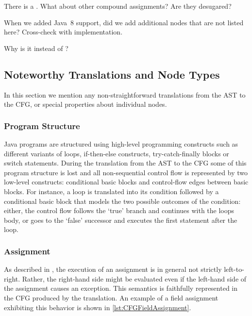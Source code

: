 \begin{workinprogress}
There is a .
What about other compound assignments? Are they desugared?
\end{workinprogress}

\begin{workinprogress}
When we added Java~8 support, did we add additional nodes that are not
listed here? Cross-check with implementation.
\end{workinprogress}

\begin{workinprogress}
Why is it  instead of ?
\end{workinprogress}


\subsection{Noteworthy Translations and Node Types}
\label{sec:noteworthy-translations}

In this section we mention any non-straightforward translations from the AST to
the CFG, or special properties about individual nodes.


\subsubsection{Program Structure}
\label{sec:prog-structure}

Java programs are structured using high-level programming constructs
such as different variants of loops, if-then-else constructs,
try-catch-finally blocks or switch statements.  During the translation
from the AST to the CFG some of this program structure is lost and all
non-sequential control flow is represented by two low-level
constructs: conditional basic blocks and control-flow edges between
basic blocks. For instance, a  loop is translated into its
condition followed by a conditional basic block that models the two
possible outcomes of the condition: either, the control flow follows
the `true' branch and continues with the loops body, or goes to the
`false' successor and executes the first statement after the loop.


\subsubsection{Assignment}

As described in , the execution of an assignment is in
general not strictly left-to-right. Rather, the right-hand side might
be evaluated even if the left-hand side of the assignment causes an
exception. This semantics is faithfully represented in the CFG
produced by the translation.  An example of a field assignment
exhibiting this behavior is shown in \autoref{lst:CFGFieldAssignment}.

